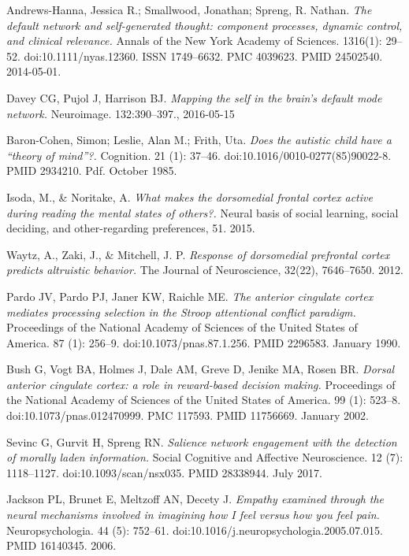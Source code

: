 \documentclass[twocolumn]{article}
\begin{document}
\begin{thebibliography}{9}
  Andrews-Hanna, Jessica R.; Smallwood, Jonathan; Spreng, R. Nathan.
  \textit{The default network and self-generated thought: component processes,
    dynamic control, and clinical relevance.}
  Annals of the New York Academy of Sciences. 1316(1):
  29–52. doi:10.1111/nyas.12360. ISSN 1749–6632. PMC 4039623. PMID 24502540. 2014-05-01.

  Davey CG, Pujol J, Harrison BJ.
  \textit{Mapping the self in the brain’s default mode network.}
  Neuroimage. 132:390–397., 2016-05-15

  Baron-Cohen, Simon; Leslie, Alan M.; Frith, Uta.
  \textit{Does the autistic child have a ``theory of mind''?.}
  Cognition. 21 (1): 37–46. doi:10.1016/0010-0277(85)90022-8. PMID
  2934210. Pdf. October 1985.

  Isoda, M., \& Noritake, A.
  \textit{What makes the dorsomedial frontal cortex active
    during reading the mental states of others?.}
  Neural basis of social learning, social deciding, and other-regarding preferences,
  51. 2015.

  Waytz, A., Zaki, J., \& Mitchell, J. P.
  \textit{Response of dorsomedial prefrontal cortex predicts altruistic behavior.}
  The Journal of Neuroscience, 32(22), 7646–7650. 2012.

  Pardo JV, Pardo PJ, Janer KW, Raichle ME.
  \textit{The anterior cingulate cortex mediates processing selection in the Stroop
    attentional conflict paradigm.}
  Proceedings of the National Academy of Sciences of the United States of
  America. 87 (1): 256–9. doi:10.1073/pnas.87.1.256. PMID 2296583. January 1990.

  Bush G, Vogt BA, Holmes J, Dale AM, Greve D, Jenike MA, Rosen BR.
  \textit{Dorsal anterior cingulate cortex: a role in reward-based decision making.}
  Proceedings of the National Academy of Sciences of the United States of
  America. 99 (1): 523–8. doi:10.1073/pnas.012470999. PMC 117593. PMID
  11756669. January 2002.

  Sevinc G, Gurvit H, Spreng RN.
  \textit{Salience network engagement with the detection of morally laden
    information.}
  Social Cognitive and Affective Neuroscience. 12 (7):
  1118–1127. doi:10.1093/scan/nsx035. PMID 28338944. July 2017.

  Jackson PL, Brunet E, Meltzoff AN, Decety J.
  \textit{Empathy examined through the neural mechanisms involved in imagining how I
    feel versus how you feel pain.}
  Neuropsychologia. 44 (5): 752–61. doi:10.1016/j.neuropsychologia.2005.07.015. PMID
  16140345. 2006.


\end{thebibliography}
\end{document}
